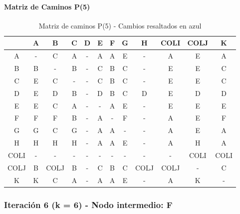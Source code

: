 \documentclass[12pt]{article}
\begin{document}
\paragraph{Matriz de Caminos P(5)}
\begin{table}[h!]
\centering
\begin{tabular}{|c|c|c|c|c|c|c|c|c|c|c|c|}
\hline
 & A & B & C & D & E & F & G & H & COLI & COLJ & K \\\hline
A & - & C & A & - & A & A & \cellcolor{lightblue} E & - & A & \cellcolor{lightblue} E & A \\\hline
B & B & - & B & - & C & B & C & - & \cellcolor{lightblue} E & \cellcolor{lightblue} E & C \\\hline
C & \cellcolor{lightblue} E & C & - & - & C & B & C & - & \cellcolor{lightblue} E & \cellcolor{lightblue} E & C \\\hline
D & \cellcolor{lightblue} E & D & B & - & D & B & C & D & \cellcolor{lightblue} E & D & D \\\hline
E & E & C & A & - & - & A & E & - & E & E & E \\\hline
F & F & F & B & - & A & - & F & - & A & \cellcolor{lightblue} E & F \\\hline
G & G & C & G & - & A & A & - & - & A & \cellcolor{lightblue} E & A \\\hline
H & H & H & H & - & A & A & \cellcolor{lightblue} E & - & A & H & A \\\hline
COLI & - & - & - & - & - & - & - & - & - & COLI & COLI \\\hline
COLJ & B & COLJ & B & - & C & B & C & COLJ & COLJ & - & C \\\hline
K & K & C & A & - & A & A & \cellcolor{lightblue} E & - & A & K & - \\\hline
\end{tabular}
\caption{Matriz de caminos P(5) - Cambios resaltados en azul}
\end{table}

\subsubsection{Iteración 6 (k = 6) - Nodo intermedio: F}
\end{document}
